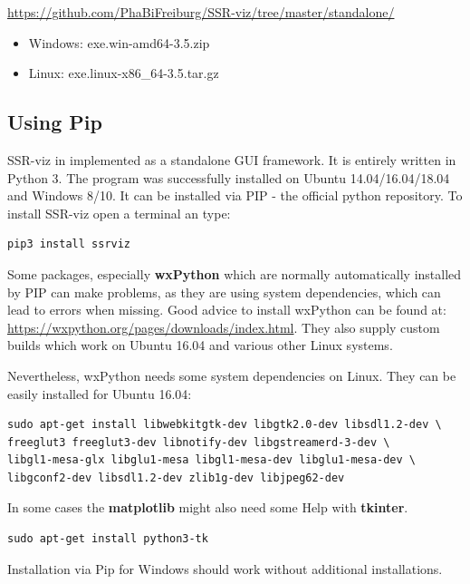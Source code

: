 \documentclass[a4paper,10pt]{article}
\begin{document}
\url{https://github.com/PhaBiFreiburg/SSR-viz/tree/master/standalone/}

\begin{itemize}
\item{Windows: exe.win-amd64-3.5.zip}
\item{Linux: exe.linux-x86\_64-3.5.tar.gz}
\end{itemize}


\subsection{Using Pip}

SSR-viz in implemented as a standalone GUI framework. It is entirely 
written in Python 3. The program was successfully installed on
Ubuntu 14.04/16.04/18.04 and Windows 8/10. It can be installed via PIP - the official python repository. 
To install SSR-viz open a terminal an type: 

\begin{verbatim}
pip3 install ssrviz
\end{verbatim}

Some packages, especially \textbf{wxPython} 
which are normally automatically installed
by PIP can make problems, as they are using system dependencies, which can 
lead to errors when missing. 
Good advice to install wxPython can be 
found at: \url{https://wxpython.org/pages/downloads/index.html}.
They also supply custom builds which work on Ubuntu 16.04 and various other
Linux systems.

Nevertheless, wxPython needs some system dependencies on Linux.
They can be easily installed for Ubuntu 16.04:

\begin{verbatim}
sudo apt-get install libwebkitgtk-dev libgtk2.0-dev libsdl1.2-dev \
freeglut3 freeglut3-dev libnotify-dev libgstreamerd-3-dev \
libgl1-mesa-glx libglu1-mesa libgl1-mesa-dev libglu1-mesa-dev \
libgconf2-dev libsdl1.2-dev zlib1g-dev libjpeg62-dev
\end{verbatim}

In some cases the \textbf{matplotlib} might also need some Help with \textbf{tkinter}.

\begin{verbatim}
sudo apt-get install python3-tk
\end{verbatim}

Installation via Pip for Windows should work without additional installations. \\
\end{document}
